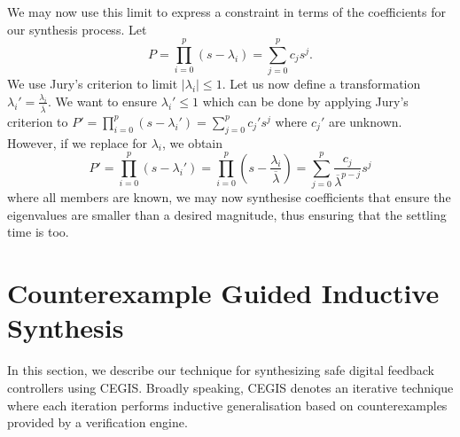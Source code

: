 \documentclass[sigconf]{llncs}
\begin{document}
%
%
We may now use this limit to express a constraint in terms of the
coefficients for our synthesis process.  Let
%
\begin{equation}
P=\prod_{i=0}^p (s-\lambda_i)=\sum_{j=0}^p c_js^j.
\end{equation}
%
We use Jury's criterion to limit $|\lambda_i| \leq 1$.  Let us now define a
transformation $\lambda_i'=\frac{\lambda_i}{\overline{\lambda}}$.  We want
to ensure $\lambda_i' \leq 1$ which can be done by applying Jury's criterion
to $P'=\prod_{i=0}^p (s-\lambda_i')=\sum_{j=0}^p c_j's^j$ where $c_j'$ are
unknown.  However, if we replace for $\lambda_i$, we obtain
%
\begin{equation}
P'=\prod_{i=0}^p (s-\lambda_i')=\prod_{i=0}^p \left(s-\frac{\lambda_i}{\overline{\lambda}}\right)=\sum_{j=0}^p \frac{c_j}{\overline{\lambda}^{p-j}}s^j
\end{equation}
%
where all members are known, we may now synthesise coefficients that ensure
the eigenvalues are smaller than a desired magnitude, thus ensuring that the
settling time is too.

\section{Counterexample Guided Inductive Synthesis} 
\label{ssec:cegis}

In this section, we describe our technique for synthesizing safe
digital feedback controllers using CEGIS. Broadly speaking, CEGIS
denotes an iterative technique where each iteration performs inductive
generalisation based on counterexamples provided by a verification
engine.
\end{document}
